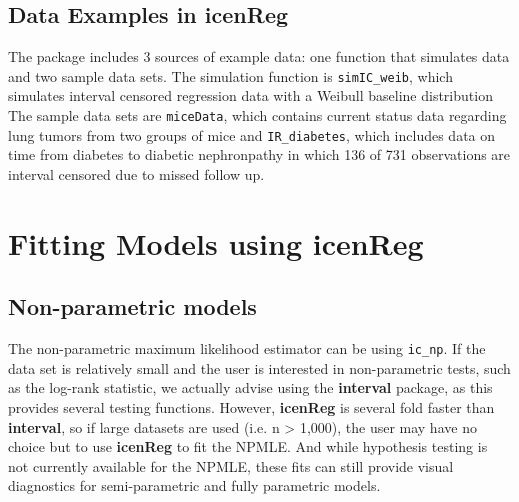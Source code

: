 \documentclass[a4paper]{article}
\begin{document}
  
\subsection{Data Examples in {\bf{icenReg}} }
  
The package includes 3 sources of example data: one function that simulates data and two sample data sets. The simulation function is \texttt{simIC\_weib}, which simulates interval censored regression data with a Weibull baseline distribution The sample data sets are \texttt{miceData}, which contains current status data regarding lung tumors from two groups of mice and \texttt{IR\_diabetes}, which includes data on time from diabetes to diabetic nephronpathy in which 136 of 731 observations are interval censored due to missed follow up. 
  
  
\section{Fitting Models using {\bf{icenReg}} }
  
  
\subsection{Non-parametric models}
  
The non-parametric maximum likelihood estimator can be using \texttt{ic\_np}. If the data set is relatively small and the user is interested in non-parametric tests, such as the log-rank statistic, we actually advise using the {\bf interval} package, as this provides several testing functions. However, {\bf icenReg} is several fold faster than {\bf interval}, so if large datasets are used (i.e. n > 1,000), the user may have no choice but to use {\bf icenReg} to fit the NPMLE. And while hypothesis testing is not currently available for the NPMLE, these fits can still provide visual diagnostics for semi-parametric and fully parametric models. 

\end{document}
